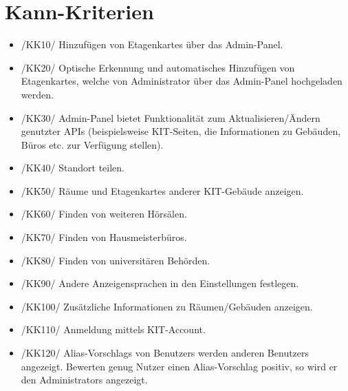 \section{Kann-Kriterien}

\begin{itemize}

    \item{/KK10/} \label{/KK10/} Hinzufügen von \Glspl{Etagenkarte} über das \Gls{Admin-Panel}.
    \item{/KK20/} \label{/KK20/} Optische Erkennung und automatisches Hinzufügen von \Glspl{Etagenkarte},
          welche von \Gls{Administrator} über das \Gls{Admin-Panel} hochgeladen werden.
          
    \item{/KK30/} \label{/KK30/} \Gls{Admin-Panel} bietet Funktionalität zum Aktualisieren/Ändern genutzter \Gls{API}s (beispielsweise \Gls{KIT}-Seiten, die Informationen zu Gebäuden, Büros etc. zur Verfügung stellen).
    \item{/KK40/} \label{/KK40/} Standort teilen.
    \item{/KK50/} \label{/KK50/} Räume und \Glspl{Etagenkarte} anderer \Gls{KIT}-Gebäude anzeigen.
    \item{/KK60/} \label{/KK60/} Finden von weiteren Hörsälen.
    \item{/KK70/} \label{/KK70/} Finden von Hausmeisterbüros.
    \item{/KK80/} \label{/KK80/} Finden von universitären Behörden.
    \item{/KK90/} \label{/KK90/} Andere Anzeigensprachen in den Einstellungen festlegen.
    \item{/KK100/} \label{/KK100/} Zusätzliche Informationen zu Räumen/Gebäuden anzeigen.
    \item{/KK110/} \label{/KK110/} Anmeldung mittels \Gls{KIT}-Account.
    \item{/KK120/} \label{/KK120/} \Glspl{Alias-Vorschlag} von \Glspl{Benutzer} werden anderen \Glspl{Benutzer} angezeigt. Bewerten genug Nutzer einen 
    \Gls{Alias-Vorschlag} positiv, so wird er den \Glspl{Administrator} angezeigt.
    
        

\end{itemize}
